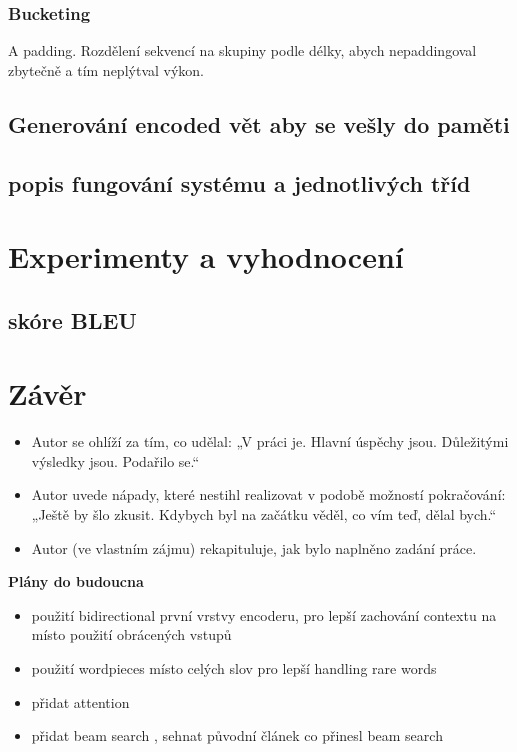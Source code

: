 \subsection{Bucketing}
A padding. Rozdělení sekvencí na skupiny podle délky, abych nepaddingoval zbytečně a tím neplýtval výkon. 

\section{Generování encoded vět aby se vešly do paměti}

\section{popis fungování systému a jednotlivých tříd}

\chapter{Experimenty a vyhodnocení}
\section{skóre BLEU}



\chapter{Závěr}
\begin{itemize}
  \item Autor se ohlíží za tím, co udělal: „V práci je. Hlavní úspěchy jsou. Důležitými výsledky jsou. Podařilo se.“
  \item Autor uvede nápady, které nestihl realizovat v podobě možností pokračování: „Ještě by šlo zkusit. Kdybych byl na začátku věděl, co vím teď, dělal bych.“
  \item Autor (ve vlastním zájmu) rekapituluje, jak bylo naplněno zadání práce.
\end{itemize}

\textbf{Plány do budoucna}
\begin{itemize}
    \item použití bidirectional první vrstvy encoderu, pro lepší zachování contextu \cite{googleBridgingGap} na místo použití obrácených vstupů
    \item použití wordpieces \cite{googleBridgingGap} místo celých slov pro lepší handling rare words
    \item přidat attention \cite{attention}
    \item přidat beam search \cite{nmtTutorial}, sehnat původní článek co přinesl beam search
\end{itemize}
